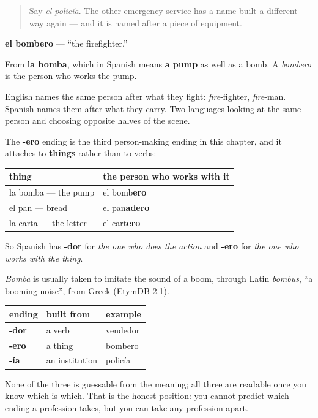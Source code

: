\label{lesson:ES-C427-bombero}



\begin{quote}
Say \emph{el policía}. The other emergency service has a name built a different way again — and it is named after a piece of equipment.
\end{quote}

\begin{cousinweb}
\textbf{el bombero} — \textquotedblleft{}the firefighter.\textquotedblright{}

From \textbf{la bomba}, which in Spanish means \textbf{a pump} as well as a bomb. A \emph{bombero} is the person who works the pump.

English names the same person after what they fight: \emph{fire}-fighter, \emph{fire}-man. Spanish names them after what they carry. Two languages looking at the same person and choosing opposite halves of the scene.

The \textbf{-ero} ending is the third person-making ending in this chapter, and it attaches to \textbf{things} rather than to verbs:

\noindent
\begin{tabularx}{\linewidth}{@{}>{\raggedright\arraybackslash}X>{\raggedright\arraybackslash}X@{}}
\toprule
\textbf{thing} & \textbf{the person who works with it} \\
\midrule
la bomba — the pump & el bomb\textbf{ero} \\
el pan — bread & el pan\textbf{adero} \\
la carta — the letter & el cart\textbf{ero} \\
\bottomrule
\end{tabularx}

So Spanish has \textbf{-dor} for \emph{the one who does the action} and \textbf{-ero} for \emph{the one who works with the thing}.

\emph{Bomba} is usually taken to imitate the sound of a boom, through Latin \emph{bombus}, \textquotedblleft{}a booming noise\textquotedblright{}, from Greek (EtymDB 2.1).
\end{cousinweb}

\begin{grammarlens}[title={Grammar Lens: three endings, three logics}]
\noindent
\begin{tabularx}{\linewidth}{@{}>{\raggedright\arraybackslash}X>{\raggedright\arraybackslash}X>{\raggedright\arraybackslash}X@{}}
\toprule
\textbf{ending} & \textbf{built from} & \textbf{example} \\
\midrule
\textbf{-dor} & a verb & vendedor \\
\textbf{-ero} & a thing & bombero \\
\textbf{-ía} & an institution & policía \\
\bottomrule
\end{tabularx}

None of the three is guessable from the meaning; all three are readable once you know which is which. That is the honest position: you cannot predict which ending a profession takes, but you can take any profession apart.
\end{grammarlens}

